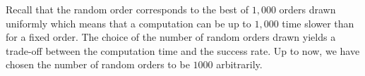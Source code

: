 \documentclass[10pt, conference, letterpaper]{IEEEtran}
\begin{document}
%     
%
%     

    Recall that the random order corresponds to the best of $1,000$ orders drawn uniformly which means that a computation can be up to $1,000$ time slower than for a fixed order. The choice of the number of random orders drawn yields a trade-off between the computation time and the success rate. Up to now, we have chosen the number of random orders to be $1000$ arbitrarily.
    
\end{document}
